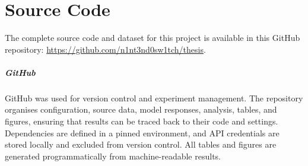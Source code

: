 \chapter{Source Code}
\label{app:code}

The complete source code and dataset for this project is available in this GitHub repository: 
\url{https://github.com/n1nt3nd0sw1tch/thesis}.


\paragraph{GitHub} GitHub was used for version control and experiment management. The repository organises configuration, source data, model responses, analysis, tables, and figures, ensuring that results can be traced back to their code and settings. Dependencies are defined in a pinned environment, and API credentials are stored locally and excluded from version control. All tables and figures are generated programmatically from machine-readable results.